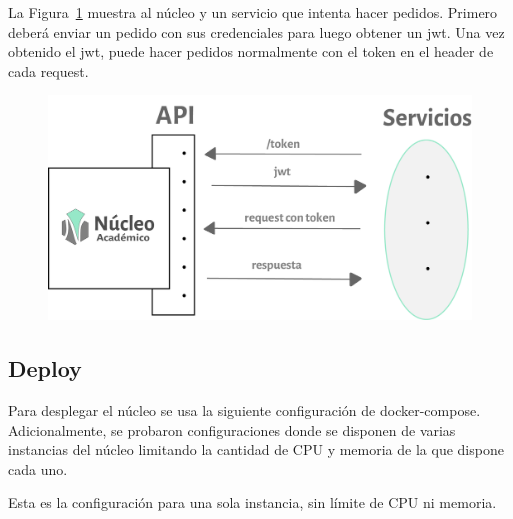 La Figura~\ref{fig:nucleo-jwt} muestra al núcleo y un servicio que intenta hacer pedidos. Primero deberá enviar un pedido con sus credenciales para luego obtener un jwt. 
Una vez obtenido el jwt, puede hacer pedidos normalmente con el token en el header de cada request.

\begin{figure}[H]
  \centering
    \includegraphics[scale=0.8]{images/nucleo/jwt.png}
  \label{fig:nucleo-jwt}
\end{figure}


\subsection{Deploy}

Para desplegar el núcleo se usa la siguiente configuración de docker-compose. Adicionalmente, se probaron configuraciones donde se disponen de varias instancias del núcleo limitando la cantidad de CPU y memoria de la que dispone cada uno. 

Esta es la configuración para una sola instancia, sin límite de CPU ni memoria.


